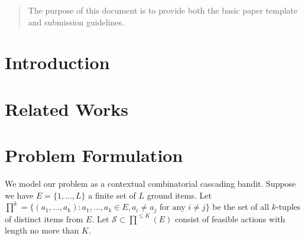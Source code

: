 \documentclass{article}
\newcommand{\cS}{\mathcal{S}}
\begin{document}
 
	
	
\begin{abstract} 
The purpose of this document is to provide both the basic paper template and submission guidelines.
\end{abstract} 
	
\section{Introduction}
	
\section{Related Works}
	
\section{Problem Formulation}
	
We model our problem as a contextual combinatorial cascading bandit. Suppose we have $E=\{1,...,L\}$ a finite set of $L$ ground items. Let $\prod^k=\{(a_1,...,a_k): a_1,...,a_k \in E, a_i \neq a_j \text{ for any } i \neq j\}$ be the set of all $k$-tuples of distinct items from $E$. Let $\cS \subset \prod^{\leq K}(E)$ consist of feasible actions with length no more than $K$.
	
\end{document}
